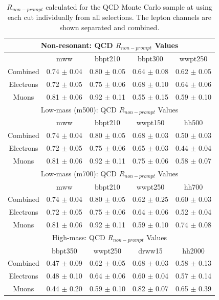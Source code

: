 \begin{table}[h!]
\centering
\begin{tabular}{c|c|c|c|c}

\hline\hline
\multicolumn{5}{c}{Non-resonant: QCD $R_{non-prompt}$ Values}\\\hline\hline 
          & mww                 & bbpt210 	        & bbpt300 	        & wwpt250	        \\ \hline 
Combined  & 0.74 $\pm$ 0.04 	& 0.80 $\pm$ 0.05  	& 0.64 $\pm$ 0.08 	& 0.62 $\pm$ 0.05	\\\hline 
Electrons & 0.72 $\pm$ 0.05  	& 0.75 $\pm$ 0.06 	& 0.68 $\pm$ 0.10 	& 0.64 $\pm$ 0.06	\\\hline 
Muons     & 0.81 $\pm$ 0.06 	& 0.92 $\pm$ 0.11 	& 0.55 $\pm$ 0.15 	& 0.59 $\pm$ 0.10	\\\hline 
\hline\hline
\multicolumn{5}{c}{Low-mass (m500): QCD $R_{non-prompt}$ Values}\\\hline\hline 
          & mww                 & bbpt210 	        & wwpt150 	        & hh500 	        \\ \hline 
Combined  & 0.74 $\pm$ 0.04 	& 0.80 $\pm$ 0.05 	& 0.68 $\pm$ 0.03  	& 0.50 $\pm$ 0.03	\\\hline 
Electrons & 0.72 $\pm$ 0.05 	& 0.75 $\pm$ 0.06 	& 0.65 $\pm$ 0.03 	& 0.44 $\pm$ 0.04	\\\hline 
Muons     & 0.81 $\pm$ 0.06 	& 0.92 $\pm$ 0.11 	& 0.75 $\pm$ 0.06 	& 0.58 $\pm$ 0.07	\\\hline 
\hline\hline

\multicolumn{5}{c}{Low-mass (m700): QCD $R_{non-prompt}$ Values}\\\hline\hline 
          & mww                 & bbpt210 	        & wwpt250 	        & hh700 	        \\ \hline 
Combined  & 0.74 $\pm$ 0.04 	& 0.80 $\pm$ 0.05 	& 0.62 $\pm$ 0.25 	& 0.60 $\pm$ 0.03	\\\hline 
Electrons & 0.72 $\pm$ 0.05 	& 0.75 $\pm$ 0.06 	& 0.64 $\pm$ 0.06 	& 0.52 $\pm$ 0.04	\\\hline 
Muons     & 0.81 $\pm$ 0.06 	& 0.92 $\pm$ 0.11 	& 0.59 $\pm$ 0.10 	& 0.74 $\pm$ 0.08	\\\hline 
\hline\hline


\multicolumn{5}{c}{High-mass: QCD $R_{non-prompt}$ Values}\\\hline\hline 
          & bbpt350             & wwpt250 	        & drww15 	        & hh2000 	        \\ \hline 
Combined  & 0.47 $\pm$ 0.09 	& 0.62 $\pm$ 0.05 	& 0.68 $\pm$ 0.03 	& 0.58 $\pm$ 0.13	\\\hline 
Electrons & 0.48 $\pm$ 0.10 	& 0.64 $\pm$ 0.06 	& 0.60 $\pm$ 0.04 	& 0.57 $\pm$ 0.14	\\\hline 
Muons     & 0.44 $\pm$ 0.20 	& 0.59 $\pm$ 0.10 	& 0.82 $\pm$ 0.07 	& 0.65 $\pm$ 0.39	\\\hline 
\hline\hline


\end{tabular}
\caption[$R_{non-prompt}$]{$R_{non-prompt}$ calculated for the QCD Monte Carlo sample at using each cut individually from all selections. The lepton channels are shown separated and combined.}
\label{tab:lepR}
\end{table}
